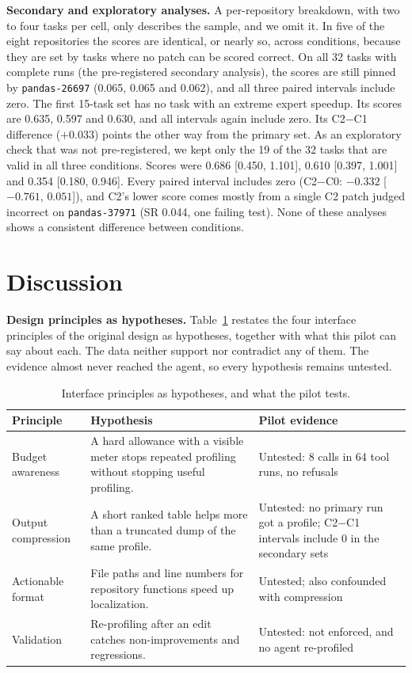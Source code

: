 \documentclass[conference]{IEEEtran}
\begin{document}
\textbf{Secondary and exploratory analyses.} A per-repository breakdown, with
two to four tasks per cell, only describes the sample, and we omit it. In
five of the eight repositories the scores are identical, or nearly so, across
conditions, because they are set by tasks where no patch can be scored
correct. On all 32 tasks with complete runs (the pre-registered
secondary analysis), the scores are still pinned by \texttt{pandas-26697}
(0.065, 0.065 and 0.062), and all three paired intervals include zero. The
first 15-task set has no task with an extreme expert speedup. Its scores are
0.635, 0.597 and 0.630, and all intervals again include zero. Its C2$-$C1
difference ($+0.033$) points the other way from the primary set. As an
exploratory check that was not pre-registered, we kept only the 19 of the 32
tasks that are valid in all three conditions. Scores were 0.686 [0.450,
1.101], 0.610 [0.397, 1.001] and 0.354 [0.180, 0.946]. Every paired interval
includes zero (C2$-$C0: $-0.332$ [$-0.761$, $0.051$]), and C2's lower score
comes mostly from a single C2 patch judged incorrect on
\texttt{pandas-37971} (SR 0.044, one failing test). None of these analyses
shows a consistent difference between conditions.

\section{Discussion}
\label{sec:discussion}

\textbf{Design principles as hypotheses.} Table~\ref{tab:principles} restates
the four interface principles of the original design as hypotheses, together
with what this pilot can say about each. The data neither support nor
contradict any of them. The evidence almost never reached the agent, so every
hypothesis remains untested.

\begin{table}[t]
\caption{Interface principles as hypotheses, and what the pilot tests.}
\label{tab:principles}
\centering
\footnotesize
\setlength{\tabcolsep}{3pt}
\begin{tabular}{@{}>{\raggedright\arraybackslash}p{1.45cm}>{\raggedright\arraybackslash}p{3.75cm}>{\raggedright\arraybackslash}p{2.45cm}@{}}
\toprule
Principle & Hypothesis & Pilot evidence \\
\midrule
Budget awareness & A hard allowance with a visible meter stops repeated
profiling without stopping useful profiling. & Untested: 8 calls in 64 tool
runs, no refusals \\
Output compression & A short ranked table helps more than a truncated dump
of the same profile. & Untested: no primary run got a profile; C2$-$C1
intervals include 0 in the secondary sets \\
Actionable format & File paths and line numbers for repository functions
speed up localization. & Untested; also confounded with compression \\
Validation & Re-profiling after an edit catches non-improvements and
regressions. & Untested: not enforced, and no agent re-profiled \\
\bottomrule
\end{tabular}
\end{table}
\end{document}
